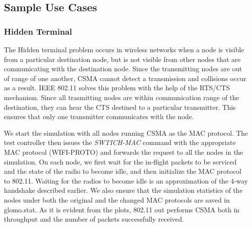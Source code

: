 \subsection{Sample Use Cases}

\subsubsection{Hidden Terminal}
The Hidden terminal problem occurs in wireless networks when a node is visible from a particular destination node, but is not visible from other nodes that are communicating with the destination node. Since the transmitting nodes are out of range of one another, CSMA cannot detect a transmission and collisions occur as a result. IEEE 802.11 solves this problem with the help of the RTS/CTS mechanism. Since all trasmitting nodes are within communication range of the destination, they can hear the CTS destined to a particular transmitter. This ensures that only one transmitter communicates with the node. 

We start the simulation with all nodes running CSMA as the MAC protocol. The test controller then issues the \emph{SWTICH-MAC} command with the appropriate MAC protocol (WIFI-PROTO) and forwards the request to all the nodes in the simulation. On each node, we first wait for the in-flight packets to be serviced and the state of the radio to become idle, and then initialize the MAC protocol to 802.11. Waiting for the radios to become idle is an approximation of the 4-way handshake described earlier. We also ensure that the simulation statistics of the nodes under both the original and the changed MAC protocols are saved in glomo.stat. As it is evident from the plots, 802.11 out performs CSMA both in throughput and the number of packets successfully received.

